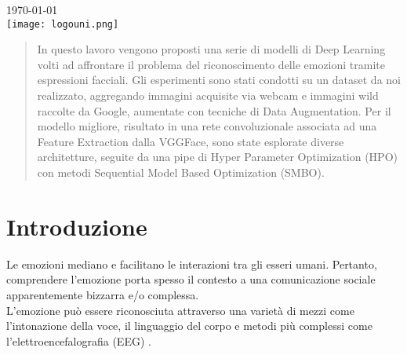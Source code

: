 \begin{titlepage}
{\large \today}\\[2cm] %


\texttt{[image: logouni.png]}\\[1cm] %
 

\vfill %

\end{titlepage}


\tableofcontents
\setcounter{page}{0}
\thispagestyle{empty}
\vspace{5mm}


\clearpage

\begin{abstract}
In questo lavoro vengono proposti una serie di modelli di Deep Learning volti ad affrontare il problema del riconoscimento delle emozioni tramite espressioni facciali. Gli esperimenti sono stati condotti su un dataset da noi realizzato, aggregando immagini acquisite via webcam e immagini wild raccolte da Google, aumentate con tecniche di Data Augmentation. Per il modello migliore, risultato in una rete convoluzionale associata ad una Feature Extraction dalla VGGFace, sono state esplorate diverse architetture, seguite da una pipe di Hyper Parameter Optimization (HPO) con metodi Sequential Model Based Optimization (SMBO). 

\end{abstract}

\section{Introduzione}
Le emozioni mediano e facilitano le interazioni tra gli esseri umani. Pertanto, comprendere l'emozione porta spesso il contesto a una comunicazione sociale apparentemente bizzarra e/o complessa.\\
L'emozione può essere riconosciuta attraverso una varietà di mezzi come l'intonazione della voce, il linguaggio del corpo e metodi più complessi come l'elettroencefalografia (EEG) \cite{article1}. 

